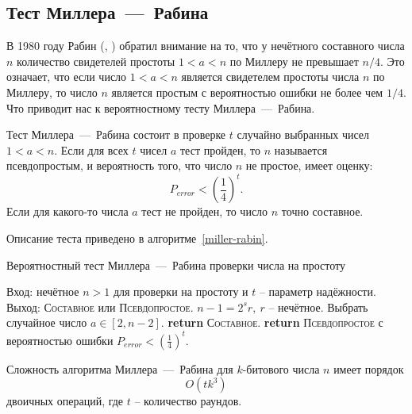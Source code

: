 \subsection{Тест Миллера~---~Рабина}\label{section-prime-check-miller-rabin}

В 1980 году Рабин (, \cite{Rabin:1980}) обратил внимание на то, что у нечётного составного числа $n$ количество свидетелей простоты $1 < a < n$ по Миллеру не превышает $n/4$. Это означает, что если число $1 < a < n$ является свидетелем простоты числа $n$ по Миллеру, то число $n$ является простым с вероятностью ошибки не более чем $1/4$. Что приводит нас к вероятностному тесту Миллера~---~Рабина.

Тест Миллера~---~Рабина состоит в проверке $t$ случайно выбранных чисел $1 < a < n$. Если для всех $t$ чисел $a$ тест пройден, то $n$ называется псевдопростым, и вероятность того, что число $n$ не простое, имеет оценку:
    \[ P_{error} < \left( \frac{1}{4} \right)^t. \]
Если для какого-то числа $a$ тест не пройден, то число $n$ точно составное.

Описание теста приведено в алгоритме~\ref{miller-rabin}.

\begin{algorithm}[ht]
    \caption{Вероятностный тест Миллера~---~Рабина проверки числа на простоту\label{miller-rabin}}
    \begin{algorithmic}
        \STATE Вход: нечётное $n>1$ для проверки на простоту и $t$ -- параметр надёжности.
        \STATE Выход: \textsc{Составное} или \textsc{Псевдопростое}.
        \STATE $n - 1 = 2^s r, ~ r$ -- нечётное.
            \STATE Выбрать случайное число $a \in [2, n-2]$.
               \STATE \textbf{return} \textsc{Составное}.
           \ENDIF
        \ENDFOR
       \STATE \textbf{return} \textsc{Псевдопростое} с вероятностью ошибки $P_{error} < \left( \frac{1}{4} \right)^t$.
    \end{algorithmic}
\end{algorithm}

Сложность алгоритма Миллера~---~Рабина для $k$-битового числа $n$ имеет порядок
    \[ O(t k^3) \]
двоичных операций, где $t$ -- количество раундов.


